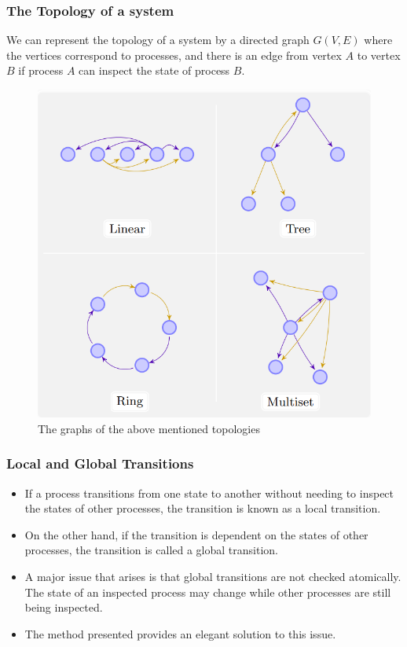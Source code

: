 \documentclass{beamer}
\begin{document}
{        \begin{frame}
            \frametitle{The Topology of a system}
            We can represent the topology of a system by a directed graph $G(V, E)$ where the vertices correspond to processes, and there is an edge from 
            vertex $A$ to vertex $B$ if process $A$ can inspect the state of process $B$.
            \begin{figure}
                \begin{center}
                    \includegraphics[scale=0.4]{images/topologies.png}
                    \caption{The graphs of the above mentioned topologies}
                \end{center}
            \end{figure}
        \end{frame}

        \begin{frame}
            \frametitle{Local and Global Transitions}
            \begin{itemize}
                \item If a process transitions from one state to another without needing to inspect the states of other processes, the transition is known as a local transition.
                \item On the other hand, if the transition is dependent on the states of other processes, the transition is called a global transition.
                \item A major issue that arises is that global transitions are not checked atomically. The state of an inspected process may change while other processes are still being inspected.
                \item The method presented provides an elegant solution to this issue.
            \end{itemize}
        \end{frame}

}
\end{document}
